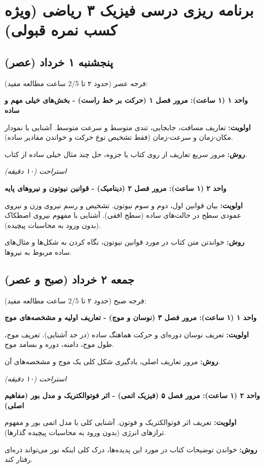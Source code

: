 \documentclass[12pt]{article}
\newcommand{\unithead}[1]{\par\vspace{1ex}\noindent\textbf{#1}\par\nopagebreak[4]\vspace{0.5ex}}
\newcommand{\休息}[1]{\par\centering\textit{#1}\par\vspace{1ex}} %
\begin{document}
\newpage %
\section*{برنامه ریزی درسی فیزیک ۳ ریاضی (ویژه کسب نمره قبولی)}

\subsection*{پنجشنبه ۱ خرداد (عصر)}
فرجه عصر (حدود ۲ تا 2/5 ساعت مطالعه مفید):

\unithead{واحد ۱ (۱ ساعت): مرور فصل ۱ (حرکت بر خط راست) - بخش‌های خیلی مهم و ساده}
\noindent\textbf{اولویت: }تعاریف مسافت، جابجایی، تندی متوسط و سرعت متوسط. آشنایی با نمودار مکان-زمان و سرعت-زمان (فقط تشخیص نوع حرکت و خواندن مقادیر ساده).
\par\noindent\textbf{روش: }مرور سریع تعاریف از روی کتاب یا جزوه، حل چند مثال خیلی ساده از کتاب.

\休息{استراحت (۱۰ دقیقه)}

\unithead{واحد ۲ (۱ ساعت): مرور فصل ۲ (دینامیک) - قوانین نیوتون و نیروهای پایه}
\noindent\textbf{اولویت: }بیان قوانین اول، دوم و سوم نیوتون. تشخیص و رسم نیروی وزن و نیروی عمودی سطح در حالت‌های ساده (سطح افقی). آشنایی با مفهوم نیروی اصطکاک (بدون ورود به محاسبات پیچیده).
\par\noindent\textbf{روش: }خواندتن متن کتاب در مورد قوانین نیوتون، نگاه کردن به شکل‌ها و مثال‌های ساده مربوط به نیروها.

\subsection*{جمعه ۲ خرداد (صبح و عصر)}
فرجه صبح (حدود ۲ تا 2/5 ساعت مطالعه مفید):

\unithead{واحد ۱ (۱ ساعت): مرور فصل ۳ (نوسان و موج) - تعاریف اولیه و مشخصه‌های موج}
\noindent\textbf{اولویت: }تعریف نوسان دوره‌ای و حرکت هماهنگ ساده (در حد آشنایی). تعریف موج، طول موج، دامنه، دوره و بسامد موج.
\par\noindent\textbf{روش: }مرور تعاریف اصلی، یادگیری شکل کلی یک موج و مشخصه‌های آن.

\休息{استراحت (۱۰ دقیقه)}

\unithead{واحد ۲ (۱ ساعت): مرور فصل ۵ (فیزیک اتمی) - اثر فوتوالکتریک و مدل بور (مفاهیم اصلی)}
\noindent\textbf{اولویت: }تعریف اثر فوتوالکتریک و فوتون. آشنایی کلی با مدل اتمی بور و مفهوم ترازهای انرژی (بدون ورود به محاسبات پیچیده گذارها).
\par\noindent\textbf{روش: }خواندن توضیحات کتاب در مورد این پدیده‌ها، درک کلی اینکه نور می‌تواند ذره‌ای رفتار کند.
\end{document}
